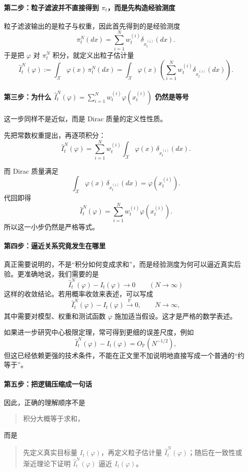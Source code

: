 \documentclass[12pt,a4paper]{ctexart}
\begin{document}
\paragraph{第二步：粒子滤波并不直接得到 \(\pi_t\)，而是先构造经验测度}
粒子滤波输出的是粒子与权重，因此首先得到的是经验测度
\[
\pi_t^N(dx)=\sum_{i=1}^N w_t^{(i)}\delta_{x_t^{(i)}}(dx).
\]
于是把 \(\varphi\) 对 \(\pi_t^N\) 积分，就定义出粒子估计量
\[
\widehat{I}_t^N(\varphi)
:=
\int_{\mathcal X}\varphi(x)\,\pi_t^N(dx)
=
\int_{\mathcal X}\varphi(x)\,
\left(\sum_{i=1}^N w_t^{(i)}\delta_{x_t^{(i)}}(dx)\right).
\]

\paragraph{第三步：为什么
\(\widehat{I}_t^N(\varphi)
= \sum_{i=1}^N w_t^{(i)}\varphi(x_t^{(i)})\)
仍然是等号}
这一步同样不是近似，而是 Dirac 质量的定义性性质。

先把常数权重提出，再逐项积分：
\[
\widehat{I}_t^N(\varphi)
= \sum_{i=1}^N w_t^{(i)}
\int_{\mathcal X}\varphi(x)\,\delta_{x_t^{(i)}}(dx).
\]

而 Dirac 质量满足
\[
\int_{\mathcal X}\varphi(x)\,\delta_{x_t^{(i)}}(dx)
= \varphi(x_t^{(i)}).
\]
代回即得
\[
\widehat{I}_t^N(\varphi)
= \sum_{i=1}^N w_t^{(i)}\varphi(x_t^{(i)}).
\]
所以这一小步仍然是严格等式。

\paragraph{第四步：逼近关系究竟发生在哪里}
真正需要说明的，不是“积分如何变成求和”，而是经验测度为何可以逼近真实后验。更准确地说，我们需要的是
\[
\widehat{I}_t^N(\varphi) - I_t(\varphi) \to 0
\qquad (N\to\infty)
\]
这样的收敛结论。若用概率收敛来表述，可以写成
\[
\widehat{I}_t^N(\varphi) - I_t(\varphi)
\xrightarrow[]{\mathbb P} 0,
\qquad N\to\infty,
\]
其中需要对模型、权重和测试函数 \(\varphi\) 施加适当假设。这才是严格的数学表述。

如果进一步研究中心极限定理，常可得到更细的误差尺度，例如
\[
\widehat{I}_t^N(\varphi) - I_t(\varphi)
= O_{\mathbb P}(N^{-1/2}),
\]
但这已经依赖更强的技术条件，不能在正文里不加说明地直接写成一个普通的“约等于”。

\paragraph{第五步：把逻辑压缩成一句话}
因此，正确的理解顺序不是
\begin{quote}
积分大概等于求和，
\end{quote}
而是
\begin{quote}
先定义真实目标量 \(I_t(\varphi)\)，再定义粒子估计量 \(\widehat{I}_t^N(\varphi)\)；随后在一致性或渐近理论下证明 \(\widehat{I}_t^N(\varphi)\) 逼近 \(I_t(\varphi)\)。
\end{quote}
\end{document}
